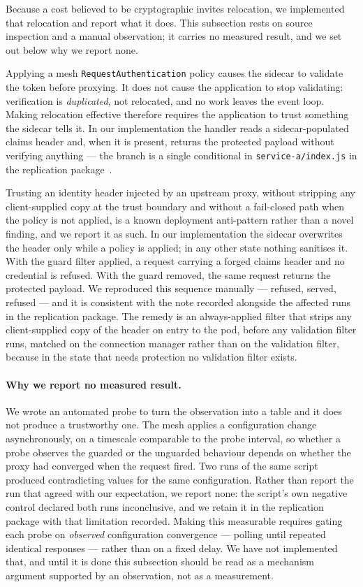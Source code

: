 \documentclass[pdflatex,sn-basic,twocolumn]{sn-jnl}%
\begin{document}
Because a cost believed to be cryptographic invites relocation, we implemented
that relocation and report what it does. This subsection rests on source
inspection and a manual observation; it carries no measured result, and we set
out below why we report none.

Applying a mesh \texttt{RequestAuthentication} policy causes the sidecar to
validate the token before proxying. It does not cause the application to stop
validating: verification is \emph{duplicated}, not relocated, and no work leaves
the event loop. Making relocation effective therefore requires the application to
trust something the sidecar tells it. In our implementation the handler reads a
sidecar-populated claims header and, when it is present, returns the protected
payload without verifying anything --- the branch is a single conditional in
\texttt{service-a/index.js} in the replication package~\cite{artifact2026}.

Trusting an identity header injected by an upstream proxy, without stripping any
client-supplied copy at the trust boundary and without a fail-closed path when
the policy is not applied, is a known deployment anti-pattern rather than a novel
finding, and we report it as such. In our implementation the sidecar overwrites
the header only while a policy is applied; in any other state nothing sanitises
it. With the guard filter applied, a request carrying a forged claims header and
no credential is refused. With the guard removed, the same request returns the
protected payload. We reproduced this sequence manually --- refused, served,
refused --- and it is consistent with the note recorded alongside the affected
runs in the replication package. The remedy is an always-applied filter that
strips any client-supplied copy of the header on entry to the pod, before any
validation filter runs, matched on the connection manager rather than on the
validation filter, because in the state that needs protection no validation
filter exists.

\paragraph{Why we report no measured result.} We wrote an automated probe to turn
the observation into a table and it does not produce a trustworthy one. The mesh
applies a configuration change asynchronously, on a timescale comparable to the
probe interval, so whether a probe observes the guarded or the unguarded
behaviour depends on whether the proxy had converged when the request fired. Two
runs of the same script produced contradicting values for the same configuration.
Rather than report the run that agreed with our expectation, we report none: the
script's own negative control declared both runs inconclusive, and we retain it
in the replication package with that limitation recorded. Making this measurable
requires gating each probe on \emph{observed} configuration convergence ---
polling until repeated identical responses --- rather than on a fixed delay. We
have not implemented that, and until it is done this subsection should be read as
a mechanism argument supported by an observation, not as a measurement.
\end{document}

